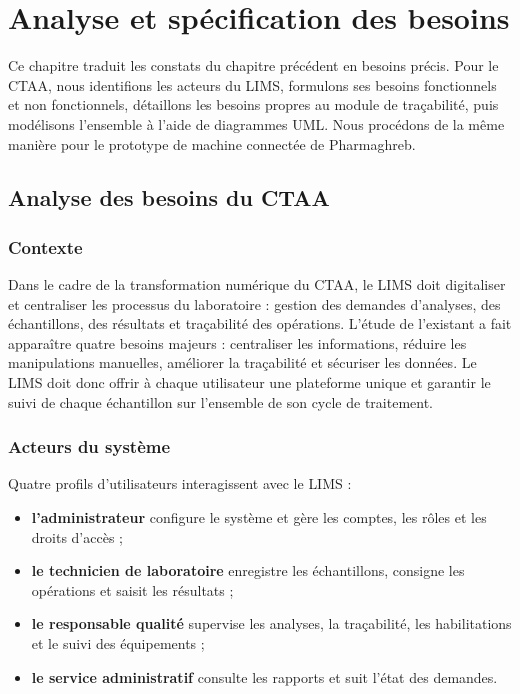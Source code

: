 \chapter{Analyse et spécification des besoins}
\label{chap:analyse-besoins}

Ce chapitre traduit les constats du chapitre précédent en besoins précis. Pour le \ac{CTAA}, nous identifions les acteurs du \ac{LIMS}, formulons ses besoins fonctionnels et non fonctionnels, détaillons les besoins propres au module de traçabilité, puis modélisons l'ensemble à l'aide de diagrammes \ac{UML}. Nous procédons de la même manière pour le prototype de machine connectée de Pharmaghreb.

\section{Analyse des besoins du CTAA}

\subsection{Contexte}

Dans le cadre de la transformation numérique du \ac{CTAA}, le \ac{LIMS} doit digitaliser et centraliser les processus du laboratoire : gestion des demandes d'analyses, des échantillons, des résultats et traçabilité des opérations. L'étude de l'existant a fait apparaître quatre besoins majeurs : centraliser les informations, réduire les manipulations manuelles, améliorer la traçabilité et sécuriser les données. Le \ac{LIMS} doit donc offrir à chaque utilisateur une plateforme unique et garantir le suivi de chaque échantillon sur l'ensemble de son cycle de traitement.

\subsection{Acteurs du système}

Quatre profils d'utilisateurs interagissent avec le \ac{LIMS} :
\begin{itemize}
    \item \textbf{l'administrateur} configure le système et gère les comptes, les rôles et les droits d'accès ;
    \item \textbf{le technicien de laboratoire} enregistre les échantillons, consigne les opérations et saisit les résultats ;
    \item \textbf{le responsable qualité} supervise les analyses, la traçabilité, les habilitations et le suivi des équipements ;
    \item \textbf{le service administratif} consulte les rapports et suit l'état des demandes.
\end{itemize}

